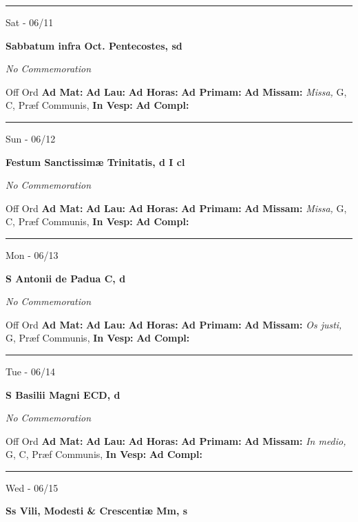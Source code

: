 \documentclass[letterpaper, 10pt]{article}
\begin{document}
\hrule
\begin{center}
Sat - 06/11
\end{center}\textbf{ \large Sabbatum infra Oct. Pentecostes, \textnormal{\normalsize sd}}

\textit{No Commemoration}\begin{justify}
Off Ord
\textbf{Ad Mat: }
\textbf{Ad Lau: }
\textbf{Ad Horas: }
\textbf{Ad Primam: }
\textbf{Ad Missam:} \textit{Missa, } G, C, Præf Communis, 
\textbf{In Vesp: }
\textbf{Ad Compl: }\end{justify}



\hrule
\begin{center}
Sun - 06/12
\end{center}\textbf{ \large Festum Sanctissimæ Trinitatis, \textnormal{\normalsize d I cl}}

\textit{No Commemoration}\begin{justify}
Off Ord
\textbf{Ad Mat: }
\textbf{Ad Lau: }
\textbf{Ad Horas: }
\textbf{Ad Primam: }
\textbf{Ad Missam:} \textit{Missa, } G, C, Præf Communis, 
\textbf{In Vesp: }
\textbf{Ad Compl: }\end{justify}



\hrule
\begin{center}
Mon - 06/13
\end{center}\textbf{ \large S Antonii de Padua C, \textnormal{\normalsize d}}

\textit{No Commemoration}\begin{justify}
Off Ord
\textbf{Ad Mat: }
\textbf{Ad Lau: }
\textbf{Ad Horas: }
\textbf{Ad Primam: }
\textbf{Ad Missam:} \textit{Os justi, } G, Præf Communis, 
\textbf{In Vesp: }
\textbf{Ad Compl: }\end{justify}



\hrule
\begin{center}
Tue - 06/14
\end{center}\textbf{ \large S Basilii Magni ECD, \textnormal{\normalsize d}}

\textit{No Commemoration}\begin{justify}
Off Ord
\textbf{Ad Mat: }
\textbf{Ad Lau: }
\textbf{Ad Horas: }
\textbf{Ad Primam: }
\textbf{Ad Missam:} \textit{In medio, } G, C, Præf Communis, 
\textbf{In Vesp: }
\textbf{Ad Compl: }\end{justify}



\hrule
\begin{center}
Wed - 06/15
\end{center}\textbf{ \large Ss Vili, Modesti \& Crescentiæ Mm, \textnormal{\normalsize s}}
\end{document}
